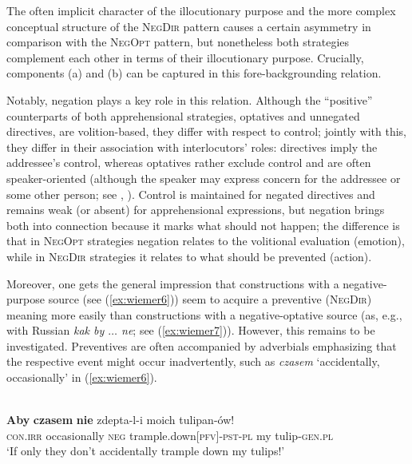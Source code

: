 \documentclass[output=paper,colorlinks,citecolor=brown]{langscibook}
\begin{document}
The often implicit character of the illocutionary purpose and the more complex conceptual structure of the \textsc{NegDir} pattern causes a certain asymmetry in comparison with the \textsc{NegOpt} pattern, but nonetheless both strategies complement each other in terms of their illocutionary purpose. Crucially, components (a) and (b) can be captured in this fore-backgrounding relation.

Notably, negation plays a key role in this relation. Although the “positive” counterparts of both apprehensional strategies, optatives and unnegated directives, are volition-based, they differ with respect to control; jointly with this, they differ in their association with interlocutors' roles: directives imply the addressee's control, whereas optatives rather exclude control and are often speaker-oriented (although the speaker may express concern for the addressee or some other person; see , ). Control is maintained for negated directives and remains weak (or absent) for apprehensional expressions, but negation brings both into connection because it marks what should not happen; the difference is that in \textsc{NegOpt} strategies negation relates to the volitional evaluation (emotion), while in \textsc{NegDir} strategies it relates to what should be prevented (action).


Moreover, one gets the general impression that constructions with a negative-purpose source (see (\ref{ex:wiemer6})) seem to acquire a preventive (\textsc{NegDir}) meaning more easily than constructions with a negative-optative source (as, e.g., with Russian \textit{kak by $\ldots$  ne}; see (\ref{ex:wiemer7})). However, this remains to be investigated. Preventives are often accompanied by adverbials emphasizing that the respective event might occur inadvertently, such as \textit{czasem} `accidentally, occasionally' in (\ref{ex:wiemer6}).

\ea
\label{ex:wiemer6} 
 \\
\gll \textbf{Aby} \textbf{czasem} \textbf{nie} zdepta-l-i moich tulipan-ów! \\
\textsc{con.irr} occasionally \textsc{neg} trample.down\textsc{[pfv]-pst-pl} my tulip-\textsc{gen.pl} \\
\glt `If only they don't accidentally trample down my tulips!' \\
\z
\end{document}
